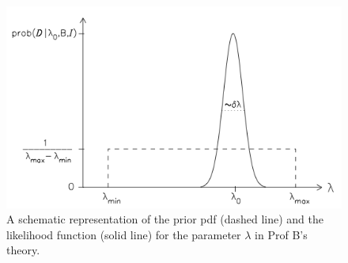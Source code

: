 \documentclass[%
oneside,                 %
final,                   %
10pt]{article}
\begin{document}
\begin{figure}[!ht]  %
  \centerline{\includegraphics[width=0.8\linewidth]{fig/fig41.png}}
  \caption{
  A schematic representation of the prior pdf (dashed line) and the likelihood function (solid line) for the parameter $\lambda$ in Prof B’s theory. \label{fig:sivia_41}
  }
\end{figure}
\end{document}
